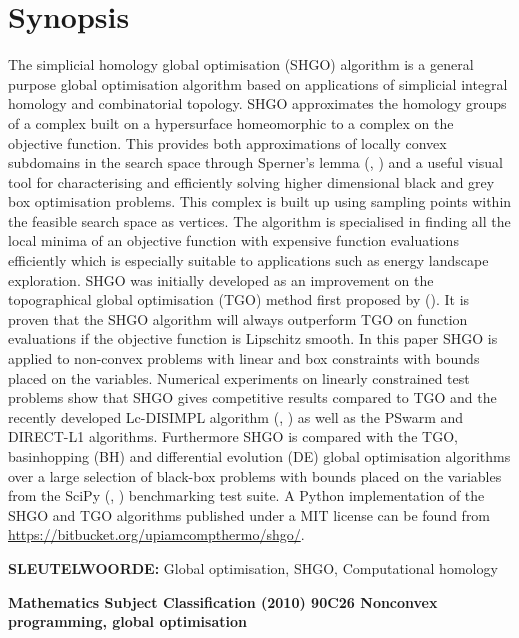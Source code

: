 \chapter*{Synopsis}
The simplicial homology global optimisation (SHGO) algorithm is a general purpose global optimisation algorithm based on applications of simplicial integral homology and combinatorial topology. SHGO approximates the homology groups of a complex built on a hypersurface homeomorphic to a complex on the objective function. This provides both approximations of locally convex subdomains in the search space through Sperner's lemma (\citeauthor{Sperner1928}, \citeyear{Sperner1928}) and a useful visual tool for characterising and efficiently solving higher dimensional black and grey box optimisation problems. This complex is built up using sampling points within the feasible search space as vertices. The algorithm is specialised in finding all the local minima of an objective function with expensive function evaluations efficiently which is especially suitable to applications such as energy landscape exploration. SHGO was initially developed as an improvement on the topographical global optimisation (TGO) method first proposed by \citeauthor{Torn1986} (\citeyear{Torn1986, Torn1990, Torn1992}). It is proven that the SHGO algorithm will always outperform TGO on function evaluations if the objective function is Lipschitz smooth. In this paper SHGO is applied to non-convex problems with linear and box constraints with bounds placed on the variables. Numerical experiments on linearly constrained test problems show that SHGO gives competitive results compared to TGO and the recently developed Lc-DISIMPL algorithm (\citeauthor{Paul2016}, \citeyear{Paul2016}) as well as the PSwarm and DIRECT-L1 algorithms. Furthermore SHGO is compared with the TGO, basinhopping (BH) and differential evolution (DE) global optimisation algorithms over a large selection of black-box problems with bounds placed on the variables from the SciPy (\citeauthor*{scipy}, \citeyear{scipy}) benchmarking test suite. A Python implementation of the SHGO and TGO algorithms published under a MIT license can be found from \url{https://bitbucket.org/upiamcompthermo/shgo/}.
\bigskip

\noindent \textbf{SLEUTELWOORDE:} Global optimisation, SHGO, Computational homology
\begin{flushleft}\bf{Mathematics Subject Classification (2010)} \normalfont 90C26 Nonconvex programming, global optimisation
\end{flushleft}


